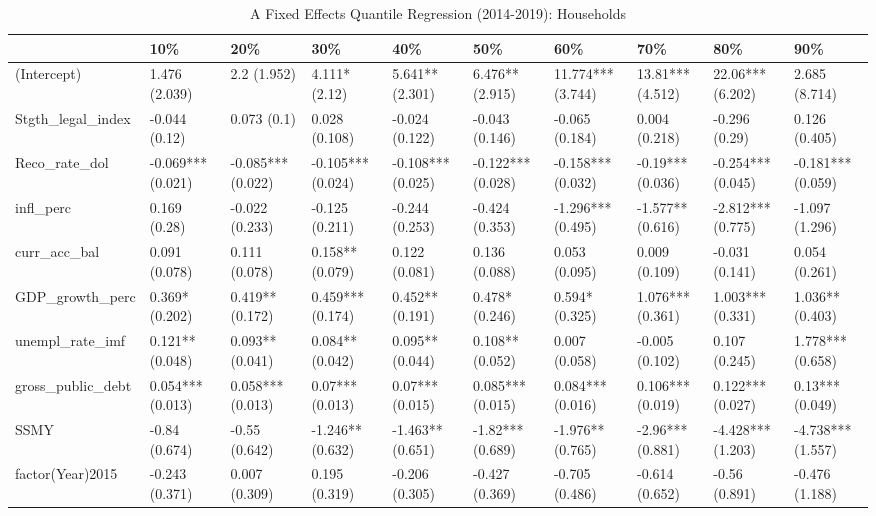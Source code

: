 \begin{table}[ht]
\centering
\caption{A Fixed Effects Quantile Regression (2014-2019): Households} 
\begingroup\small
\begin{tabular}{llllllllll}
  \toprule
 & 10\% & 20\% & 30\% & 40\% & 50\% & 60\% & 70\% & 80\% & 90\% \\ 
  \midrule
(Intercept) & 1.476 (2.039) & 2.2 (1.952) & 4.111* (2.12) & 5.641** (2.301) & 6.476** (2.915) & 11.774*** (3.744) & 13.81*** (4.512) & 22.06*** (6.202) & 2.685 (8.714) \\ 
  Stgth\_legal\_index & -0.044 (0.12) & 0.073 (0.1) & 0.028 (0.108) & -0.024 (0.122) & -0.043 (0.146) & -0.065 (0.184) & 0.004 (0.218) & -0.296 (0.29) & 0.126 (0.405) \\ 
  Reco\_rate\_dol & -0.069*** (0.021) & -0.085*** (0.022) & -0.105*** (0.024) & -0.108*** (0.025) & -0.122*** (0.028) & -0.158*** (0.032) & -0.19*** (0.036) & -0.254*** (0.045) & -0.181*** (0.059) \\ 
  infl\_perc & 0.169 (0.28) & -0.022 (0.233) & -0.125 (0.211) & -0.244 (0.253) & -0.424 (0.353) & -1.296*** (0.495) & -1.577** (0.616) & -2.812*** (0.775) & -1.097 (1.296) \\ 
  curr\_acc\_bal & 0.091 (0.078) & 0.111 (0.078) & 0.158** (0.079) & 0.122 (0.081) & 0.136 (0.088) & 0.053 (0.095) & 0.009 (0.109) & -0.031 (0.141) & 0.054 (0.261) \\ 
  GDP\_growth\_perc & 0.369* (0.202) & 0.419** (0.172) & 0.459*** (0.174) & 0.452** (0.191) & 0.478* (0.246) & 0.594* (0.325) & 1.076*** (0.361) & 1.003*** (0.331) & 1.036** (0.403) \\ 
  unempl\_rate\_imf & 0.121** (0.048) & 0.093** (0.041) & 0.084** (0.042) & 0.095** (0.044) & 0.108** (0.052) & 0.007 (0.058) & -0.005 (0.102) & 0.107 (0.245) & 1.778*** (0.658) \\ 
  gross\_public\_debt & 0.054*** (0.013) & 0.058*** (0.013) & 0.07*** (0.013) & 0.07*** (0.015) & 0.085*** (0.015) & 0.084*** (0.016) & 0.106*** (0.019) & 0.122*** (0.027) & 0.13*** (0.049) \\ 
  SSMY & -0.84 (0.674) & -0.55 (0.642) & -1.246** (0.632) & -1.463** (0.651) & -1.82*** (0.689) & -1.976** (0.765) & -2.96*** (0.881) & -4.428*** (1.203) & -4.738*** (1.557) \\ 
  factor(Year)2015 & -0.243 (0.371) & 0.007 (0.309) & 0.195 (0.319) & -0.206 (0.305) & -0.427 (0.369) & -0.705 (0.486) & -0.614 (0.652) & -0.56 (0.891) & -0.476 (1.188) \\ 

\end{tabular}
\end{table}
